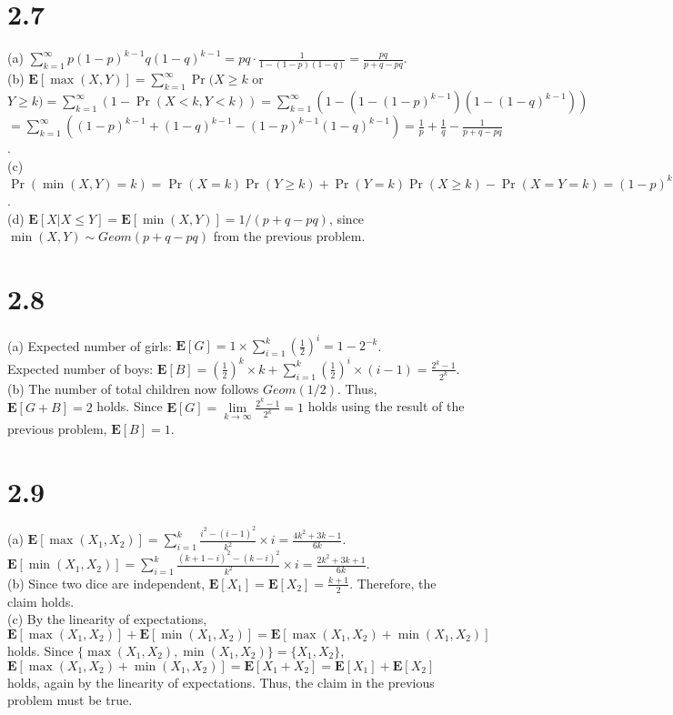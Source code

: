 \documentclass{article}
\begin{document}
\section*{2.7}
(a) $\sum\limits_{k=1}^\infty p(1-p)^{k-1}q(1-q)^{k-1}=pq\cdot\frac{1}{1-(1-p)(1-q)}=\frac{pq}{p+q-pq}$.\\
(b) $\textbf{E}[\max (X,Y)]=\sum\limits_{k=1}^\infty \Pr(X\geq k$ or $Y \geq k)=\sum\limits_{k=1}^\infty(1-\Pr(X<k,Y<k))=\sum\limits_{k=1}^\infty(1-(1-(1-p)^{k-1})(1-(1-q)^{k-1}))$\\
$=\sum\limits_{k=1}^\infty((1-p)^{k-1}+(1-q)^{k-1}-(1-p)^{k-1}(1-q)^{k-1})=\frac{1}{p}+\frac{1}{q}-\frac{1}{p+q-pq}$.\\
(c) $\Pr(\min(X,Y)=k)=\Pr(X=k)\Pr(Y\geq k)+\Pr(Y=k)\Pr(X\geq k)-\Pr(X=Y=k)=(1-p)^{k-1}(1-q)^{k-1}(p+q-pq)=(1-(p+q-pq))^{k-1}(p+q-pq)$.\\
(d) $\textbf{E}[X|X\leq Y]=\textbf{E}[\min(X,Y)]=1/(p+q-pq)$, since $\min(X,Y)\sim Geom(p+q-pq)$ from the previous problem.
\section*{2.8}
(a) Expected number of girls: $\textbf{E}[G]=1\times\sum\limits_{i=1}^k(\frac{1}{2})^i=1-2^{-k}$.\\
Expected number of boys: $\textbf{E}[B]=(\frac{1}{2})^k\times k+\sum\limits_{i=1}^k(\frac{1}{2})^i\times(i-1)=\frac{2^k-1}{2^k}$.\\
(b) The number of total children now follows $Geom(1/2)$. Thus, $\textbf{E}[G+B]=2$ holds. Since $\textbf{E}[G]=\lim\limits_{k\rightarrow \infty}\frac{2^k-1}{2^k}=1$ holds using the result of the previous problem, $\textbf{E}[B]=1$.
\section*{2.9}
(a) $\textbf{E}[\max(X_1,X_2)]=\sum\limits_{i=1}^k\frac{i^2-(i-1)^2}{k^2}\times i=\frac{4k^2+3k-1}{6k}$.\\
$\textbf{E}[\min(X_1,X_2)]=\sum\limits_{i=1}^k\frac{(k+1-i)^2-(k-i)^2}{k^2}\times i=\frac{2k^2+3k+1}{6k}$.\\
(b) Since two dice are independent, $\textbf{E}[X_1]=\textbf{E}[X_2]=\frac{k+1}{2}$. Therefore, the claim holds.\\
(c) By the linearity of expectations, $\textbf{E}[\max(X_1,X_2)]+\textbf{E}[\min(X_1,X_2)]=\textbf{E}[\max(X_1,X_2)+\min(X_1,X_2)]$ holds.
Since $\{\max(X_1,X_2),\min(X_1,X_2)\}=\{X_1,X_2\}$, $\textbf{E}[\max(X_1,X_2)+\min(X_1,X_2)]=\textbf{E}[X_1+X_2]=\textbf{E}[X_1]+\textbf{E}[X_2]$ holds, again by the linearity of expectations.
Thus, the claim in the previous problem must be true.
\end{document}
